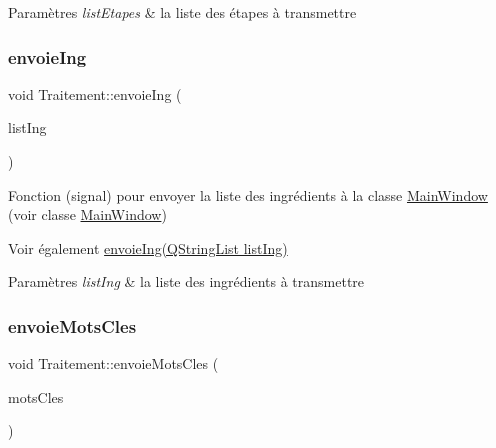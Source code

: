 \begin{DoxyParams}{Paramètres}
{\em list\+Etapes} & la liste des étapes à transmettre \\
\hline
\end{DoxyParams}
\mbox{\label{classTraitement_a630cf3c588e1d8436665e27b738930da}} 
\subsubsection{\texorpdfstring{envoie\+Ing}{envoieIng}}
{\footnotesize\ttfamily void Traitement\+::envoie\+Ing (\begin{DoxyParamCaption}\item[{Q\+String\+List}]{list\+Ing }\end{DoxyParamCaption})\hspace{0.3cm}{\ttfamily [signal]}}



Fonction (signal) pour envoyer la liste des ingrédients à la classe \hyperlink{classMainWindow}{Main\+Window} (voir classe \hyperlink{classMainWindow}{Main\+Window}) 

\begin{DoxySeeAlso}{Voir également}
\hyperlink{classTraitement_a630cf3c588e1d8436665e27b738930da}{envoie\+Ing(\+Q\+String\+List list\+Ing)} 
\end{DoxySeeAlso}

\begin{DoxyParams}{Paramètres}
{\em list\+Ing} & la liste des ingrédients à transmettre \\
\hline
\end{DoxyParams}
\mbox{\label{classTraitement_ac54c2833459c0fb24b0c15d589d05ef5}} 
\subsubsection{\texorpdfstring{envoie\+Mots\+Cles}{envoieMotsCles}}
{\footnotesize\ttfamily void Traitement\+::envoie\+Mots\+Cles (\begin{DoxyParamCaption}\item[{Q\+String}]{mots\+Cles }\end{DoxyParamCaption})\hspace{0.3cm}{\ttfamily [signal]}}



